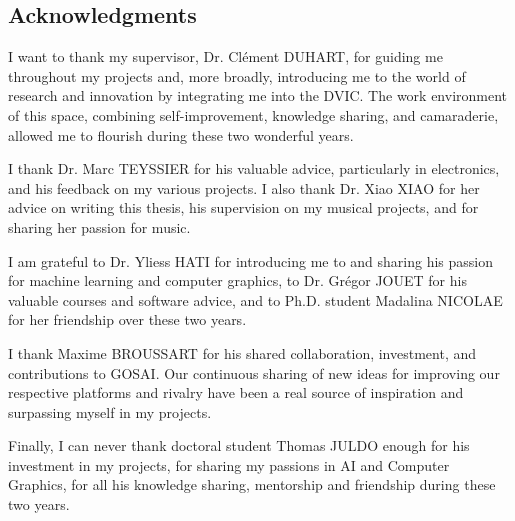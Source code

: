 \subsection*{Acknowledgments}

I want to thank my supervisor, Dr. Clément DUHART, for guiding me throughout my projects and, more broadly, introducing me to the world of research and innovation by integrating me into the DVIC. The work environment of this space, combining self-improvement, knowledge sharing, and camaraderie, allowed me to flourish during these two wonderful years.

I thank Dr. Marc TEYSSIER for his valuable advice, particularly in electronics, and his feedback on my various projects. I also thank Dr. Xiao XIAO for her advice on writing this thesis, his supervision on my musical projects, and for sharing her passion for music.

I am grateful to Dr. Yliess HATI for introducing me to and sharing his passion for machine learning and computer graphics, to Dr. Grégor JOUET for his valuable courses and software advice, and to Ph.D. student Madalina NICOLAE for her friendship over these two years.

I thank Maxime BROUSSART for his shared collaboration, investment, and contributions to GOSAI. Our continuous sharing of new ideas for improving our respective platforms and rivalry have been a real source of inspiration and surpassing myself in my projects.

Finally, I can never thank doctoral student Thomas JULDO enough for his investment in my projects, for sharing my passions in AI and Computer Graphics, for all his knowledge sharing, mentorship and friendship during these two years. 